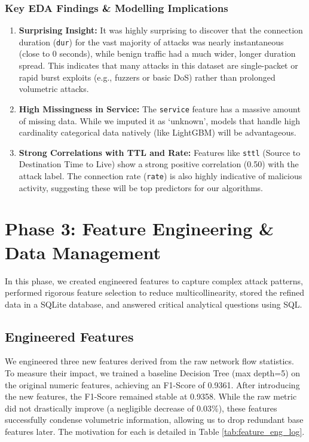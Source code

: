 \documentclass[12pt, a4paper]{article}
\begin{document}
\subsubsection{Key EDA Findings \& Modelling Implications}
\begin{enumerate}
    \item \textbf{Surprising Insight:} It was highly surprising to discover that the connection duration (\texttt{dur}) for the vast majority of attacks was nearly instantaneous (close to 0 seconds), while benign traffic had a much wider, longer duration spread. This indicates that many attacks in this dataset are single-packet or rapid burst exploits (e.g., fuzzers or basic DoS) rather than prolonged volumetric attacks.
    \item \textbf{High Missingness in Service:} The \texttt{service} feature has a massive amount of missing data. While we imputed it as `unknown', models that handle high cardinality categorical data natively (like LightGBM) will be advantageous.
    \item \textbf{Strong Correlations with TTL and Rate:} Features like \texttt{sttl} (Source to Destination Time to Live) show a strong positive correlation (0.50) with the attack label. The connection rate (\texttt{rate}) is also highly indicative of malicious activity, suggesting these will be top predictors for our algorithms.
\end{enumerate}

\section{Phase 3: Feature Engineering \& Data Management}

In this phase, we created engineered features to capture complex attack patterns, performed rigorous feature selection to reduce multicollinearity, stored the refined data in a SQLite database, and answered critical analytical questions using SQL.

\subsection{Engineered Features}
We engineered three new features derived from the raw network flow statistics. To measure their impact, we trained a baseline Decision Tree (max depth=5) on the original numeric features, achieving an F1-Score of 0.9361. After introducing the new features, the F1-Score remained stable at 0.9358. While the raw metric did not drastically improve (a negligible decrease of 0.03\%), these features successfully condense volumetric information, allowing us to drop redundant base features later. The motivation for each is detailed in Table \ref{tab:feature_eng_log}.
\end{document}
